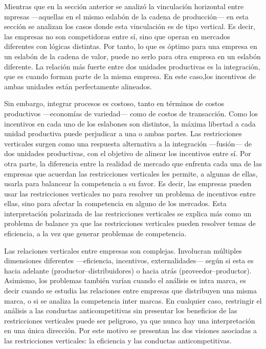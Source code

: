\documentclass[
  12pt,
  spanish,
]{book}
\begin{document}
Mientras que en la sección anterior se analizó la vinculación horizontal
entre mpresas ---aquellas en el mismo eslabón de la cadena de
producción--- en esta sección se analizan los casos donde esta
vinculación es de tipo vertical. Es decir, las empresas no son
competidoras entre sí, sino que operan en mercados diferentes con
lógicas distintas. Por tanto, lo que es óptimo para una empresa en un
eslabón de la cadena de valor, puede no serlo para otra empresa en un
eslabón diferente. La relación más fuerte entre dos unidades productivas
es la integración, que es cuando forman parte de la misma empresa. En
este caso,los incentivos de ambas unidades están perfectamente
alineados.

Sin embargo, integrar procesos es costoso, tanto en términos de costos
productivos ---economías de variedad--- como de costos de transacción.
Como los incentivos en cada uno de los eslabones son distintos, la
máxima libertad a cada unidad productiva puede perjudicar a una o ambas
partes. Las restricciones verticales surgen como una respuesta
alternativa a la integración ---fusión--- de dos unidades productivas,
con el objetivo de alinear los incentivos entre sí. Por otra parte, la
diferencia entre la realidad de mercado que enfrenta cada una de las
empresas que acuerdan las restricciones verticales les permite, a
algunas de ellas, usarla para balancear la competencia a su favor. Es
decir, las empresas pueden usar las restricciones verticales no para
resolver un problema de incentivos entre ellas, sino para afectar la
competencia en alguno de los mercados. Esta interpretación polarizada de
las restricciones verticales se explica más como un problema de balance
ya que las restricciones verticales pueden resolver temas de eficiencia,
a la vez que generar problemas de competencia.

Las relaciones verticales entre empresas son complejas. Involucran
múltiples dimensiones diferentes ---eficiencia, incentivos,
externalidades--- según si esta es hacia adelante
(productor--distribuidores) o hacia atrás (proveedor--productor).
Asimismo, los problemas también varían cuando el análisis es intra
marca, es decir cuando se estudia las relaciones entre empresas que
distribuyen una misma marca, o si se analiza la competencia inter
marcas. En cualquier caso, restringir el análisis a las conductas
anticompetitivas sin presentar los beneficios de las restricciones
verticales puede ser peligroso, ya que nunca hay una interpretación en
una única dirección. Por este motivo se presentan las dos visiones
asociadas a las restricciones verticales: la eficiencia y las conductas
anticompetitivas.
\end{document}

